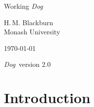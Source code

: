 \documentclass[11pt,a4paper]{report}
\newcommand{\Dog}{\emph{Dog}}
\begin{document}
\begin{titlepage}
\centering

\vspace*{\fill}

{\huge Working \Dog}

\vspace{\fill}

\begin{figure}[h]
\begin{center}
\end{center}
\end{figure}

\vspace{\fill}

{\large H.\,M. Blackburn}\\
Monash University

\vspace{\fill}

\today

\Dog\ version 2.0

\vspace*{\fill}

\end{titlepage}


\tableofcontents

\clearpage

\chapter{Introduction}
\end{document}

